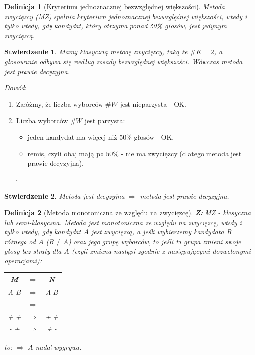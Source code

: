 \documentclass[12pt,a4paper]{article}
\newcounter{twierdzenie}
\theoremstyle{break}
\newtheorem{definition}{Definicja}[section]
\newtheorem{stwierdzenie}{Stwierdzenie}[section]
\begin{document}
	\begin{definition}[Kryterium jednoznacznej bezwzględnej większości]
		Metoda zwycięzcy (MZ) spełnia kryterium jednoznacznej bezwzględnej większości, \textit{wtedy i tylko wtedy}, gdy kandydat, który otrzyma ponad 50\% głosów, jest jedynym zwycięzcą.
	\end{definition}
	
	\begin{stwierdzenie}
		Mamy klasyczną metodę zwycięzcy, taką że $\# K=2$, a głosowanie odbywa się według zasady bezwzględnej większości. Wówczas metoda jest prawie decyzyjna.
	\end{stwierdzenie}
	
	\textit{Dowód:}
	\begin{enumerate}[1$^\circ$]
		\item Załóżmy, że liczba wyborców $\# W$ jest nieparzysta - OK.
		\item Liczba wyborców $\# W$ jest parzysta:
		\begin{itemize}
			\item jeden kandydat ma więcej niż 50\% głosów - OK.
			\item remis, czyli obaj mają po 50\% - nie ma zwycięzcy (dlatego metoda jest prawie decyzyjna).
		\end{itemize}
		\begin{flushright}$\square$\end{flushright}
	\end{enumerate} 
	
	\begin{stwierdzenie}
		Metoda jest decyzyjna $\Rightarrow$ metoda jest prawie decyzyjna.
	\end{stwierdzenie}
	
	\begin{definition}[Metoda monotoniczna ze względu na zwycięzcę]
		\textbf{Z:} MZ - klasyczna lub semi-klasyczna.
		Metoda jest monotoniczna ze względu na zwycięzcę, \textit{wtedy i tylko wtedy}, gdy kandydat $A$ jest zwycięzcą, a jeśli wybierzemy kandydata $B$ różnego od $A$ ($B\neq A$) oraz jego grupę wyborców, to jeśli ta grupa zmieni swoje głosy bez straty dla $A$ (czyli zmiana nastąpi zgodnie z następującymi dozwolonymi operacjami):
		
		\begin{tabular}{|c|c|c|}
			\hline
			M & $\Rightarrow$ & N \\\hline
			A B & $\Rightarrow$ & A B \\\hline
			- - & $\Rightarrow$ & - - \\\hline
			+ + & $\Rightarrow$ & + + \\\hline
			- + & $\Rightarrow$ & + - \\\hline
		\end{tabular}
		
		to: $\Rightarrow$ $A$ nadal wygrywa.
	\end{definition}
	
\end{document}
